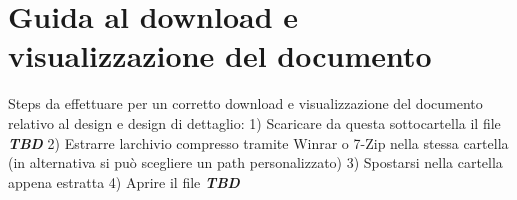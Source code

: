 \chapter{Guida al download e visualizzazione del documento}
\hypertarget{md_docs_2_design_01e_01_design_01di_01dettaglio_2_r_e_a_d_m_e}{}\label{md_docs_2_design_01e_01_design_01di_01dettaglio_2_r_e_a_d_m_e}
\label{md_docs_2_design_01e_01_design_01di_01dettaglio_2_r_e_a_d_m_e_autotoc_md0}%
%


Steps da effettuare per un corretto download e visualizzazione del documento relativo al design e design di dettaglio\+: 1) Scaricare da questa sottocartella il file {\itshape {\bfseries{TBD}}} 2) Estrarre l\textquotesingle{}archivio compresso tramite Winrar o 7-\/Zip nella stessa cartella (in alternativa si può scegliere un path personalizzato) 3) Spostarsi nella cartella appena estratta 4) Aprire il file {\itshape {\bfseries{TBD}}} 